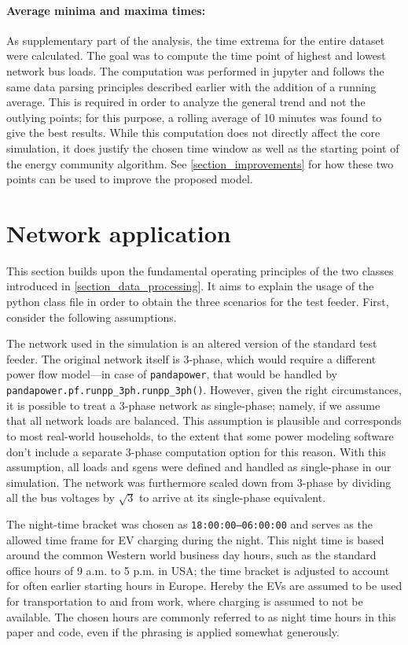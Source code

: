 \documentclass[a4paper,10pt]{report}
\begin{document}
\paragraph{Average minima and maxima times:} As supplementary part of the analysis, the time extrema for the entire dataset were calculated. The goal was to compute the time point of highest and lowest network bus loads. The computation was performed in jupyter and follows the same data parsing principles described earlier with the addition of a running average. This is required in order to analyze the general trend and not the outlying points; for this purpose, a rolling average of 10 minutes was found to give the best results. While this computation does not directly affect the core simulation, it does justify the chosen time window as well as the starting point of the energy community algorithm. See \cref{section_improvements} for how these two points can be used to improve the proposed model.

\newpage
\section{Network application}\label{section_network_application}
This section builds upon the fundamental operating principles of the two classes introduced in \cref{section_data_processing}. It aims to explain the usage of the python class file in order to obtain the three scenarios for the test feeder. First, consider the following assumptions.

The network used in the simulation is an altered version of the standard test feeder. The original network itself is 3-phase, which would require a different power flow model---in case of \texttt{pandapower}, that would be handled by \texttt{pandapower.pf.runpp\_3ph.runpp\_3ph()}. However, given the right circumstances, it is possible to treat a 3-phase network as single-phase; namely, if we assume that all network loads are balanced. This assumption is plausible and corresponds to most real-world households, to the extent that some power modeling software don't include a separate 3-phase computation option for this reason. With this assumption, all loads and sgens were defined and handled as single-phase in our simulation. The network was furthermore scaled down from 3-phase by dividing all the bus voltages by $\sqrt{3}$ to arrive at its single-phase equivalent.

The night-time bracket was chosen as \texttt{18:00:00--06:00:00} and serves as the allowed time frame for EV charging during the night. This night time is based around the common Western world business day hours, such as the standard office hours of 9 a.m. to 5 p.m. in USA; the time bracket is adjusted to account for often earlier starting hours in Europe. Hereby the EVs are assumed to be used for transportation to and from work, where charging is assumed to not be available. The chosen hours are commonly referred to as night time hours in this paper and code, even if the phrasing is applied somewhat generously.
\end{document}
